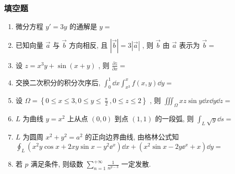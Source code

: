 \subsubsection{填空题}
\begin{enumerate}
	\item 微分方程 $y'=3y$ 的通解是 $y=$\underline{\hspace{8pc}}
	
	\item 已知向量 $\vec{a}$ 与 $\vec{b}$ 方向相反, 且 $\left|\vec{b}\right|=3|\vec{a}|$ , 则 $\vec{b}$ 由 $\vec{a}$ 表示为 $\vec{b}=$\underline{\hspace{8pc}}
	
	\item 设 $z=x^3 y+\sin(x+y)$ , 则 $\frac{\partial z}{\partial x}=$\underline{\hspace{8pc}}
	
	\item 交换二次积分的积分次序后, $\int_0^1 \dd x\int_{x^3}^{x} f(x,y)\dd y=$\underline{\hspace{8pc}}
	
	\item 设 $\Omega=\left\{ 0\leq x\leq 3, 0\leq y\leq \frac{\uppi}{2}, 0\leq z\leq 2 \right\}$ , 则 $\iiint_{\Omega}xz\sin y\dd x\dd y\dd z=$\underline{\hspace{8pc}}
	
	\item $L$ 为曲线 $y=x^2$ 上从点 $(0,0)$ 到点 $(1,1)$ 的一段弧, 则 $\int_{L}\sqrt{y}\dd s=$\underline{\hspace{8pc}}
	
	\item $L$ 为圆周 $x^2+y^2=a^2$ 的正向边界曲线, 由格林公式知 $\oint_{L} \left( x^2y\cos x+2xy\sin x-y^2 \ee^x \right)\dd x + \left( x^2\sin x-2y\ee^x+x \right)\dd y=$\underline{\hspace{8pc}}
	
	\item 若 $p$ 满足条件\underline{\hspace{8pc}}, 则级数 $\sum_{n=1}^{+\infty}\frac{1}{n^{p-3}}$ 一定发散.
\end{enumerate}

